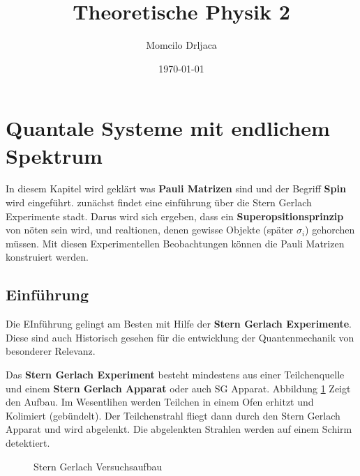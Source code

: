 \documentclass{article}
\title{Theoretische Physik 2}
\author{Momcilo Drljaca}
\date{\today}
\begin{document}
\maketitle
\raggedright

\section{Quantale Systeme mit endlichem Spektrum}

\color{cyan}

In diesem Kapitel wird geklärt was \textbf{Pauli Matrizen} sind und der Begriff \textbf{Spin} wird eingeführt. zunächst findet eine einführung über die Stern Gerlach Experimente stadt. Darus wird sich ergeben, dass ein \textbf{Superopsitionsprinzip} von nöten sein wird, und realtionen, denen gewisse Objekte (später $\sigma_i$) gehorchen müssen. Mit diesen Experimentellen Beobachtungen können die Pauli Matrizen konstruiert werden.

\color{black}
\subsection{Einführung}
\color{cyan}
Die EInführung gelingt am Besten mit Hilfe der \textbf{Stern Gerlach Experimente}. Diese sind auch Historisch gesehen für die entwicklung der Quantenmechanik von besonderer Relevanz.
\color{black}
\newline


Das \textbf{Stern Gerlach Experiment} besteht mindestens aus einer Teilchenquelle und einem \textbf{Stern Gerlach Apparat} oder auch SG Apparat\color{black}. Abbildung \ref{Stern Gerlach Experiment} Zeigt den Aufbau. \color{cyan} Im Wesentlihen werden Teilchen in einem Ofen erhitzt und Kolimiert (gebündelt). Der Teilchenstrahl fliegt dann durch den Stern Gerlach Apparat und wird abgelenkt. Die abgelenkten Strahlen werden auf einem Schirm detektiert.\color{black}





\begin{figure}

\centering
{}
\caption{Stern Gerlach Versuchsaufbau}
\label{Stern Gerlach Experiment}
\end{figure}
\end{document}
